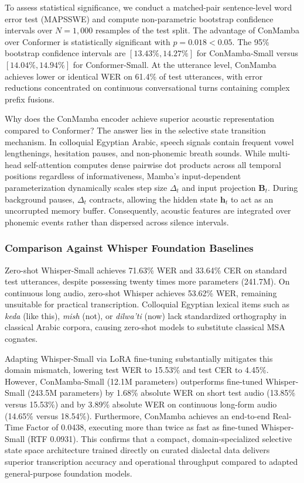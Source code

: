 \documentclass[journal]{IEEEtran}
\begin{document}
To assess statistical significance, we conduct a matched-pair sentence-level word error test (MAPSSWE) and compute non-parametric bootstrap confidence intervals over $N=1,000$ resamples of the test split. The advantage of ConMamba over Conformer is statistically significant with $p = 0.018 < 0.05$. The 95\% bootstrap confidence intervals are $[13.43\%, 14.27\%]$ for ConMamba-Small versus $[14.04\%, 14.94\%]$ for Conformer-Small. At the utterance level, ConMamba achieves lower or identical WER on 61.4\% of test utterances, with error reductions concentrated on continuous conversational turns containing complex prefix fusions.

Why does the ConMamba encoder achieve superior acoustic representation compared to Conformer? The answer lies in the selective state transition mechanism. In colloquial Egyptian Arabic, speech signals contain frequent vowel lengthenings, hesitation pauses, and non-phonemic breath sounds. While multi-head self-attention computes dense pairwise dot products across all temporal positions regardless of informativeness, Mamba's input-dependent parameterization dynamically scales step size $\Delta_t$ and input projection $\mathbf{B}_t$. During background pauses, $\Delta_t$ contracts, allowing the hidden state $\mathbf{h}_t$ to act as an uncorrupted memory buffer. Consequently, acoustic features are integrated over phonemic events rather than dispersed across silence intervals.

\subsubsection{Comparison Against Whisper Foundation Baselines}
Zero-shot Whisper-Small achieves 71.63\% WER and 33.64\% CER on standard test utterances, despite possessing twenty times more parameters (241.7M). On continuous long audio, zero-shot Whisper achieves 53.62\% WER, remaining unsuitable for practical transcription. Colloquial Egyptian lexical items such as \textit{keda} (like this), \textit{mish} (not), or \textit{dilwa'ti} (now) lack standardized orthography in classical Arabic corpora, causing zero-shot models to substitute classical MSA cognates.

Adapting Whisper-Small via LoRA fine-tuning substantially mitigates this domain mismatch, lowering test WER to 15.53\% and test CER to 4.45\%. However, ConMamba-Small (12.1M parameters) outperforms fine-tuned Whisper-Small (243.5M parameters) by 1.68\% absolute WER on short test audio (13.85\% versus 15.53\%) and by 3.89\% absolute WER on continuous long-form audio (14.65\% versus 18.54\%). Furthermore, ConMamba achieves an end-to-end Real-Time Factor of 0.0438, executing more than twice as fast as fine-tuned Whisper-Small (RTF 0.0931). This confirms that a compact, domain-specialized selective state space architecture trained directly on curated dialectal data delivers superior transcription accuracy and operational throughput compared to adapted general-purpose foundation models.
\end{document}
